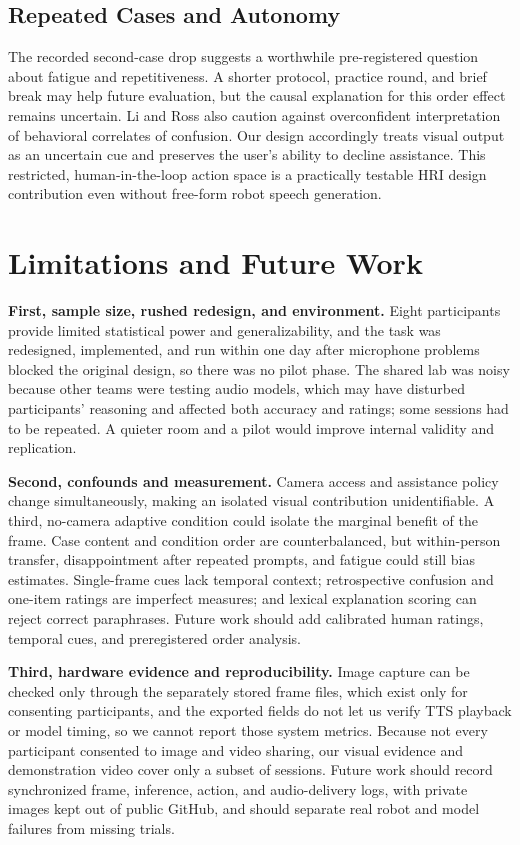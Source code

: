 \documentclass[conference]{IEEEtran}
\begin{document}
\subsection{Repeated Cases and Autonomy}
The recorded second-case drop suggests a worthwhile pre-registered question about fatigue and repetitiveness. A shorter protocol, practice round, and brief break may help future evaluation, but the causal explanation for this order effect remains uncertain. Li and Ross \cite{li2023hmm,li2023invoking} also caution against overconfident interpretation of behavioral correlates of confusion. Our design accordingly treats visual output as an uncertain cue and preserves the user's ability to decline assistance. This restricted, human-in-the-loop action space is a practically testable HRI design contribution even without free-form robot speech generation.

\section{Limitations and Future Work}
\textbf{First, sample size, rushed redesign, and environment.} Eight participants provide limited statistical power and generalizability, and the task was redesigned, implemented, and run within one day after microphone problems blocked the original design, so there was no pilot phase. The shared lab was noisy because other teams were testing audio models, which may have disturbed participants' reasoning and affected both accuracy and ratings; some sessions had to be repeated. A quieter room and a pilot would improve internal validity and replication.

\textbf{Second, confounds and measurement.} Camera access and assistance policy change simultaneously, making an isolated visual contribution unidentifiable. A third, no-camera adaptive condition could isolate the marginal benefit of the frame. Case content and condition order are counterbalanced, but within-person transfer, disappointment after repeated prompts, and fatigue could still bias estimates. Single-frame cues lack temporal context; retrospective confusion and one-item ratings are imperfect measures; and lexical explanation scoring can reject correct paraphrases. Future work should add calibrated human ratings, temporal cues, and preregistered order analysis.

\textbf{Third, hardware evidence and reproducibility.} Image capture can be checked only through the separately stored frame files, which exist only for consenting participants, and the exported fields do not let us verify TTS playback or model timing, so we cannot report those system metrics. Because not every participant consented to image and video sharing, our visual evidence and demonstration video cover only a subset of sessions. Future work should record synchronized frame, inference, action, and audio-delivery logs, with private images kept out of public GitHub, and should separate real robot and model failures from missing trials.
\end{document}
